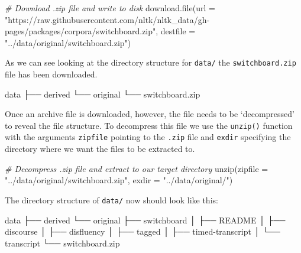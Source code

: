 \documentclass[
]{article}
\newenvironment{Shaded}{\begin{snugshade}}{\end{snugshade}}
\newcommand{\AttributeTok}[1]{\textcolor[rgb]{0.77,0.63,0.00}{#1}}
\newcommand{\CommentTok}[1]{\textcolor[rgb]{0.56,0.35,0.01}{\textit{#1}}}
\newcommand{\ExtensionTok}[1]{#1}
\newcommand{\FunctionTok}[1]{\textcolor[rgb]{0.00,0.00,0.00}{#1}}
\newcommand{\NormalTok}[1]{#1}
\newcommand{\StringTok}[1]{\textcolor[rgb]{0.31,0.60,0.02}{#1}}
\begin{document}
\begin{Shaded}
\begin{Highlighting}[]
\CommentTok{\# Download .zip file and write to disk}
\FunctionTok{download.file}\NormalTok{(}\AttributeTok{url =} \StringTok{"https://raw.githubusercontent.com/nltk/nltk\_data/gh{-}pages/packages/corpora/switchboard.zip"}\NormalTok{,}
    \AttributeTok{destfile =} \StringTok{"../data/original/switchboard.zip"}\NormalTok{)}
\end{Highlighting}
\end{Shaded}

As we can see looking at the directory structure for \texttt{data/} the \texttt{switchboard.zip} file has been downloaded.

\begin{Shaded}
\begin{Highlighting}[]
\ExtensionTok{data}
\ExtensionTok{├──}\NormalTok{ derived}
\ExtensionTok{└──}\NormalTok{ original}
    \ExtensionTok{└──}\NormalTok{ switchboard.zip}
\end{Highlighting}
\end{Shaded}

Once an archive file is downloaded, however, the file needs to be `decompressed' to reveal the file structure. To decompress this file we use the \texttt{unzip()} function with the arguments \texttt{zipfile} pointing to the \texttt{.zip} file and \texttt{exdir} specifying the directory where we want the files to be extracted to.

\begin{Shaded}
\begin{Highlighting}[]
\CommentTok{\# Decompress .zip file and extract to our target directory}
\FunctionTok{unzip}\NormalTok{(}\AttributeTok{zipfile =} \StringTok{"../data/original/switchboard.zip"}\NormalTok{, }\AttributeTok{exdir =} \StringTok{"../data/original/"}\NormalTok{)}
\end{Highlighting}
\end{Shaded}

The directory structure of \texttt{data/} now should look like this:

\begin{Shaded}
\begin{Highlighting}[]
\ExtensionTok{data}
\ExtensionTok{├──}\NormalTok{ derived}
\ExtensionTok{└──}\NormalTok{ original}
    \ExtensionTok{├──}\NormalTok{ switchboard}
    \ExtensionTok{│}\NormalTok{   ├── README}
    \ExtensionTok{│}\NormalTok{   ├── discourse}
    \ExtensionTok{│}\NormalTok{   ├── disfluency}
    \ExtensionTok{│}\NormalTok{   ├── tagged}
    \ExtensionTok{│}\NormalTok{   ├── timed{-}transcript}
    \ExtensionTok{│}\NormalTok{   └── transcript}
    \ExtensionTok{└──}\NormalTok{ switchboard.zip}
\end{Highlighting}
\end{Shaded}
\end{document}
